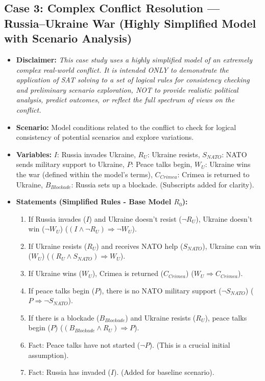 \documentclass[11pt, a4paper]{article}
\begin{document}
\subsection*{Case 3: Complex Conflict Resolution — Russia–Ukraine War (Highly Simplified Model with Scenario Analysis)}
\begin{itemize}
    \item \textbf{Disclaimer:} \textit{This case study uses a highly simplified model of an extremely complex real-world conflict. It is intended ONLY to demonstrate the application of SAT solving to a set of logical rules for consistency checking and preliminary scenario exploration, NOT to provide realistic political analysis, predict outcomes, or reflect the full spectrum of views on the conflict.}
    \item \textbf{Scenario:} Model conditions related to the conflict to check for logical consistency of potential scenarios and explore variations.
    \item \textbf{Variables:}
        $I$: Russia invades Ukraine, $R_U$: Ukraine resists, $S_{NATO}$: NATO sends military support to Ukraine, $P$: Peace talks begin, $W_U$: Ukraine wins the war (defined within the model's terms), $C_{Crimea}$: Crimea is returned to Ukraine, $B_{Blockade}$: Russia sets up a blockade. (Subscripts added for clarity).
    \item \textbf{Statements (Simplified Rules - Base Model $R_0$):}
    \begin{enumerate}
        \item If Russia invades ($I$) and Ukraine doesn't resist ($\neg R_U$), Ukraine doesn't win ($\neg W_U$) ($(I \wedge \neg R_U) \Rightarrow \neg W_U$).
        \item If Ukraine resists ($R_U$) and receives NATO help ($S_{NATO}$), Ukraine can win ($W_U$) ($(R_U \wedge S_{NATO}) \Rightarrow W_U$).
        \item If Ukraine wins ($W_U$), Crimea is returned ($C_{Crimea}$) ($W_U \Rightarrow C_{Crimea}$).
        \item If peace talks begin ($P$), there is no NATO military support ($\neg S_{NATO}$) ($P \Rightarrow \neg S_{NATO}$).
        \item If there is a blockade ($B_{Blockade}$) and Ukraine resists ($R_U$), peace talks begin ($P$) ($(B_{Blockade} \wedge R_U) \Rightarrow P$).
        \item Fact: Peace talks have not started ($\neg P$). (This is a crucial initial assumption).
        \item Fact: Russia has invaded ($I$). (Added for baseline scenario).

\end{enumerate}
\end{itemize}
\end{document}
